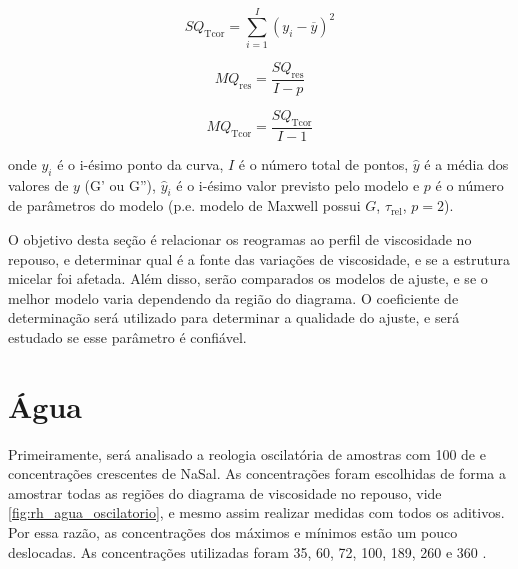 		\begin{equation}
			SQ_\mathrm{Tcor} = \sum_{i=1}^{I} \left(y_i - \overline{y} \right)^2
			\label{eqn:SQTcor}
		\end{equation}
		
		\begin{equation}
			MQ_\mathrm{res} = \dfrac{SQ_\mathrm{res}}{I-p}
			\label{eqn:MQres}
		\end{equation}
		
		\begin{equation}
			MQ_\mathrm{Tcor} = \dfrac{SQ_\mathrm{Tcor}}{I - 1}
			\label{eqn:MQTcor}
		\end{equation}
		
		\noindent onde \(y_i\) é o i-ésimo ponto da curva, \(I\) é o número total de pontos, \(\hat{y}\) é a média dos valores de \(y\) (G' ou G''), \(\hat{y}_i\) é o i-ésimo valor previsto pelo modelo e \(p\) é o número de parâmetros do modelo (p.e. modelo de Maxwell possui \(G\), \(\tau_\mathrm{rel}\), \(p=2\)).
		
		O objetivo desta seção é relacionar os reogramas ao perfil de viscosidade no repouso, e determinar qual é a fonte das variações de viscosidade, e se a estrutura micelar foi afetada. Além disso, serão comparados os modelos de ajuste, e se o melhor modelo varia dependendo da região do diagrama. O coeficiente de determinação será utilizado para determinar a qualidade do ajuste, e será estudado se esse parâmetro é confiável.
		
		\section{Água}
		\label{sec:reologia_oscilatoria_experimental_agua}
		
		Primeiramente, será analisado a reologia oscilatória de amostras com 100 \mM{} de \CTAB{} e concentrações crescentes de NaSal. As concentrações foram escolhidas de forma a amostrar todas as regiões do diagrama de viscosidade no repouso, vide \autoref{fig:rh_agua_oscilatorio}, e mesmo assim realizar medidas com todos os aditivos. Por essa razão, as concentrações dos máximos e mínimos estão um pouco deslocadas. As concentrações utilizadas foram 35, 60, 72, 100, 189, 260 e 360 \mM.

